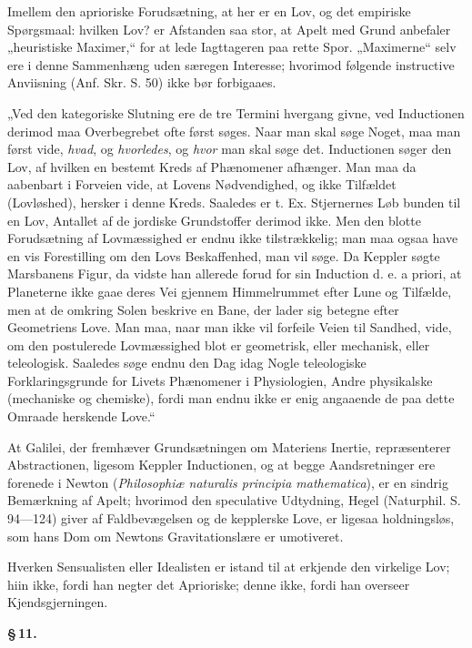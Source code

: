 \documentclass[12pt]{book}
\newcommand{\opage}[1]{\marginnote{\footnotesize\textit{[#1]}}}
\begin{document}
Imellem den aprioriske Forudsætning, at her er en Lov, og det empiriske Spørgsmaal:
hvilken Lov? er Afstanden saa stor, at Apelt med Grund anbefaler „heuristiske
Maximer,“ for at lede Iagttageren paa rette Spor. „Maximerne“ selv ere i denne
Sammenhæng uden særegen Interesse; hvorimod følgende instructive Anviisning (Anf. Skr.
S. 50) ikke bør forbigaaes.

„Ved den kategoriske Slutning ere de tre Termini hvergang givne, ved Inductionen
derimod maa Overbegrebet ofte først søges. Naar man skal søge Noget, maa man først
vide, \emph{hvad}, og \emph{hvorledes}, og \emph{hvor} man skal søge det. Inductionen
søger den Lov, af hvilken en bestemt Kreds af Phænomener afhænger. Man maa da aabenbart
i Forveien vide, at Lovens Nødvendighed, og ikke Tilfældet (Lovløshed), hersker i denne
Kreds. Saaledes er t. Ex. Stjernernes Løb bunden til en Lov, Antallet af de jordiske
Grundstoffer derimod ikke. Men den blotte Forudsætning af Lovmæssighed er endnu ikke
tilstrækkelig; man maa ogsaa have en vis Forestilling om den Lovs Beskaffenhed, man vil
søge. Da Keppler søgte Marsbanens Figur, da vidste han allerede forud for sin
Induction d. e. a priori, at Planeterne ikke gaae deres Vei gjennem Himmelrummet efter
Lune og Tilfælde, men at de omkring Solen beskrive en Bane, der lader sig betegne efter
Geometriens Love. Man maa, naar man ikke vil forfeile Veien til Sandhed, vide, om den
postulerede Lovmæssighed blot er geometrisk, eller mechanisk, eller teleologisk.
Saaledes søge endnu den Dag idag Nogle teleologiske Forklaringsgrunde for Livets
Phænomener i Physiologien, Andre physikalske (mechaniske og chemiske), fordi man endnu
ikke er enig angaaende de paa dette Omraade herskende Love.“

\opage{60} At Galilei, der fremhæver Grundsætningen om Materiens Inertie, repræsenterer
Abstractionen, ligesom Keppler Inductionen, og at begge Aandsretninger ere forenede i
Newton (\textit{Philosophiæ naturalis principia mathematica}), er en sindrig
Bemærkning af Apelt; hvorimod den speculative Udtydning, Hegel (Naturphil. S. 94—124)
giver af Faldbevægelsen og de kepplerske Love, er ligesaa holdningsløs, som hans Dom om
Newtons Gravitationslære er umotiveret.

Hverken Sensualisten eller Idealisten er istand til at erkjende den virkelige Lov;
hiin ikke, fordi han negter det Aprioriske; denne ikke, fordi han overseer
Kjendsgjerningen.

\begin{center}{\bfseries \S\,11.}\end{center}
\end{document}
